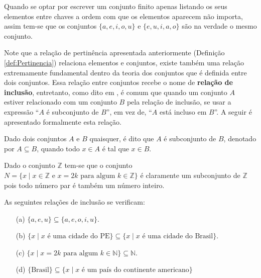\begin{remark}
	Quando se optar por escrever um conjunto finito apenas listando os seus elementos entre chaves a ordem com que os elementos aparecem não importa, assim tem-se que os conjuntos $\{a, e, i, o , u\}$ e $\{e, u, i, a, o\}$ são na verdade o mesmo conjunto.
\end{remark}

Note que a relação de pertinência  apresentada anteriormente (Definição \ref{def:Pertinencia}) relaciona elementos e conjuntos, existe também uma relação extremamente fundamental dentro da teoria dos conjuntos que é definida entre dois conjuntos. Essa relação entre conjuntos recebe o nome de \textbf{relação de inclusão}, entretanto, como dito em \cite{lipschutz1978-TC}, é comum que quando um conjunto $A$ estiver relacionado com um conjunto $B$ pela relação de inclusão, se usar a expressão ``$A$ é subconjunto de $B$'', em vez de, ``$A$ está incluso em $B$''. A seguir é apresentado formalmente esta relação.

\begin{definition}\label{def:RelacaoInclusao}
	Dado dois conjuntos $A$ e $B$ quaisquer, é dito que $A$ é subconjunto de $B$, denotado por $A \subseteq B$, quando todo $x \in A$ é tal que $x \in B$.
\end{definition}

\begin{example}\label{exe:ConjuntoHerdeiro}
	Dado o conjunto $\mathbb{Z}$ tem-se que o conjunto $N = \{x \mid x \in \mathbb{Z} \mbox{ e } x = 2k \mbox{ para algum } k \in \mathbb{Z}\}$ é claramente um subconjunto de $\mathbb{Z}$ pois todo número par é também um número inteiro.
\end{example}

\begin{example}\label{exe:Inclusao}
	As seguintes relações de inclusão se verificam:
	\begin{itemize}
		\item[(a)] $\{a, e, u\} \subseteq \{a, e, o, i , u\}$.
		\item[(b)] $\{x \mid x \mbox{ é uma cidade do PE}\} \subseteq \{x \mid x \mbox{ é uma cidade do Brasil}\}$.
		\item[(c)] $\{x \mid x = 2k \mbox{ para algum } k \in \mathbb{N}\} \subseteq \mathbb{N}$.
		\item[(d)] $\{\mbox{Brasil}\} \subseteq \{x \mid x \mbox{ é um país do continente americano}\}$
	\end{itemize}
\end{example}

